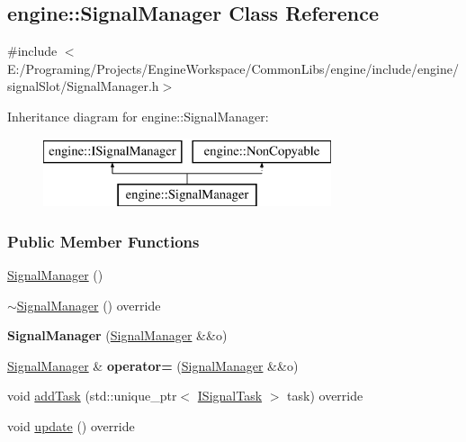 \hypertarget{a00067}{}\subsection{engine\+:\+:Signal\+Manager Class Reference}
\label{a00067}


{\ttfamily \#include $<$E\+:/\+Programing/\+Projects/\+Engine\+Workspace/\+Common\+Libs/engine/include/engine/signal\+Slot/\+Signal\+Manager.\+h$>$}

Inheritance diagram for engine\+:\+:Signal\+Manager\+:\begin{figure}[H]
\begin{center}
\leavevmode
\includegraphics[height=2.000000cm]{a00067}
\end{center}
\end{figure}
\subsubsection*{Public Member Functions}
\begin{DoxyCompactItemize}
\item 
\hyperlink{a00067_aba0cfccea1f10a10e9de9193fb62f358}{Signal\+Manager} ()
\item 
\hyperlink{a00067_a1ad7e4f03ac0657b1ecf90c981053cde}{$\sim$\+Signal\+Manager} () override
\item 
{\bfseries Signal\+Manager} (\hyperlink{a00067}{Signal\+Manager} \&\&o)\hypertarget{a00067_ac2b5bdc38573dc7a5b0c83b5888092c1}{}\label{a00067_ac2b5bdc38573dc7a5b0c83b5888092c1}

\item 
\hyperlink{a00067}{Signal\+Manager} \& {\bfseries operator=} (\hyperlink{a00067}{Signal\+Manager} \&\&o)\hypertarget{a00067_a9689ac87adac17f9bed5282d67f7dc3a}{}\label{a00067_a9689ac87adac17f9bed5282d67f7dc3a}

\item 
void \hyperlink{a00067_a5ac2136c91ad2e8a5e912f3f906d0073}{add\+Task} (std\+::unique\+\_\+ptr$<$ \hyperlink{a00052}{I\+Signal\+Task} $>$ task) override
\item 
void \hyperlink{a00067_a4e2dbe6e08226abfca06f172606b102b}{update} () override
\end{DoxyCompactItemize}


